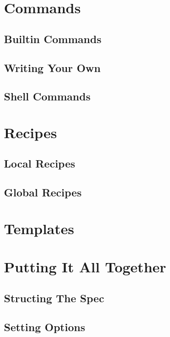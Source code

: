 \section{Commands}


\subsection{Builtin Commands}


\subsection{Writing Your Own}


\subsection{Shell Commands}



\section{Recipes}


\subsection{Local Recipes}


\subsection{Global Recipes}



\section{Templates}



\section{Putting It All Together}


\subsection{Structing The Spec}


\subsection{Setting Options}


